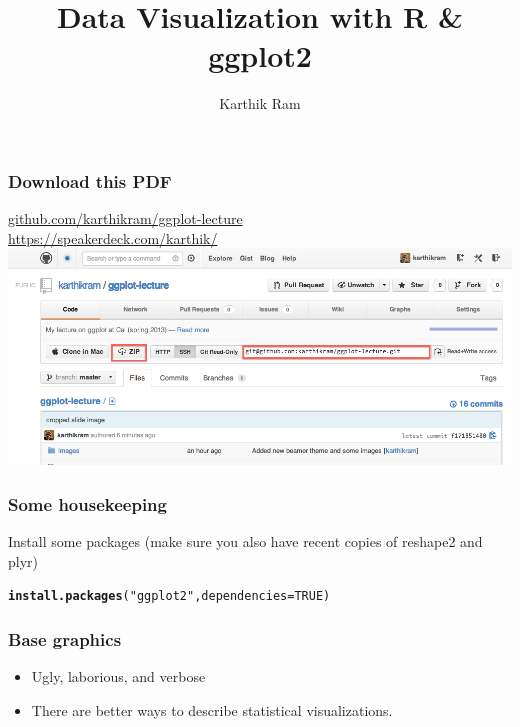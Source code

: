 \documentclass{beamer}\usepackage{graphicx, color}
\makeatletter
\newcommand{\hlfunctioncall}[1]{\textcolor[rgb]{0.501960784313725,0,0.329411764705882}{\textbf{#1}}}%
\newcommand{\hlstring}[1]{\textcolor[rgb]{0.6,0.6,1}{#1}}%
\newenvironment{kframe}{%
 \def\at@end@of@kframe{}%
 \ifinner\ifhmode%
  \def\at@end@of@kframe{\end{minipage}}%
  \begin{minipage}{\columnwidth}%
 \fi\fi%
 \def\FrameCommand##1{\hskip\@totalleftmargin \hskip-\fboxsep
 \colorbox{shadecolor}{##1}\hskip-\fboxsep
     \hskip-\linewidth \hskip-\@totalleftmargin \hskip\columnwidth}%
 \MakeFramed {\advance\hsize-\width
   \@totalleftmargin\z@ \linewidth\hsize
   \@setminipage}}%
 {\par\unskip\endMakeFramed%
 \at@end@of@kframe}
\newenvironment{knitrout}{}{} %
\makeatother
\begin{document}
\title{Data Visualization with R \& ggplot2}
\author{Karthik Ram}
\maketitle

\begin{frame}[fragile]
\frametitle{Download this PDF}
\begingroup
    \fontsize{12pt}{12pt}\selectfont
\href{http://github.com/karthikram/ggplot-lecture}{github.com/karthikram/ggplot-lecture}\\
\href{https://speakerdeck.com/karthik/}{https://speakerdeck.com/karthik/}
\endgroup
\includegraphics[scale=.31]{images/git_repo.png}
\end{frame}

\begin{frame}[fragile]
\frametitle{Some housekeeping}
Install some packages (make sure you also have recent copies of reshape2 and plyr)
\begin{knitrout}\footnotesize
{}\color{fgcolor}\begin{kframe}
\begin{alltt}
\hlfunctioncall{install.packages}(\hlstring{"ggplot2"}, dependencies = TRUE)
\end{alltt}
\end{kframe}
\end{knitrout}

\end{frame}



\begin{frame}[fragile]
\frametitle{Base graphics}
\begin{itemize}
\item Ugly, laborious, and verbose\\
\item There are better ways to describe statistical visualizations.\\
\end{itemize}
\end{frame}
\end{document}
